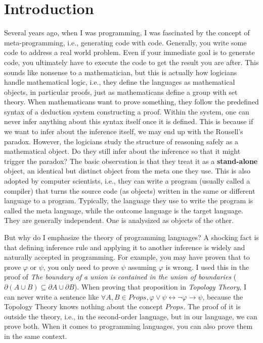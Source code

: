 \chapter*{Introduction}

Several years ago, when I was programming, I was fascinated
by the concept of meta-programming, i.e., generating code with code. 
Generally, you write some code to address a real world problem. 
Even if your immediate goal is to generate code, you ultimately have
to execute the code to get the result you are after. 
This sounds like nonsense to a mathematician, but this is actually how 
logicians handle mathematical logic, i.e., they define the languages as 
mathematical objects, in particular proofs, just as mathematicans define 
a group with set theory. When mathematicans want to prove something, they 
follow the predefined syntax of a deduction system constructing a proof. 
Within the system, one can never infer anything about this syntax itself 
once it is defined. This is because if we want to infer about the 
inference itself, we may end up with the Rousell's paradox. However, the 
logicians study the structure of reasoning safely as a mathematical object. 
Do they still infer about the inference so that it might trigger the 
paradox? The basic observation is that they treat it as a 
{\bf stand-alone} object, an identical but distinct object from the meta 
one they use. This is also adopted by computer scientists, i.e., they can 
write a program (usually called a compiler) that turns the source code 
(as objects) written in the same or different language to a program. 
Typically, the language they use to write the program is called the meta 
language, while the outcome language is the target language. They are 
generally independent. One is analysized as objects of the other. 

But why do I emphasize the theory of programming languages? A shocking 
fact is that defining inference rule and applying it to another 
inference is widely and naturally accepted in programming. For example, 
you may have proven that to prove $\varphi$ or $\psi$, you only need to 
prove $\psi$ assuming $\varphi$ is wrong. I used this in the proof of 
{\it The boundary of a union is contained in the union of boundaries} 
($\partial(A\cup B)\subseteq \partial A \cup\partial B$). 
When proving that proposition in {\it Topology Theory}, I can never 
write a sentence like $\forall A,B\in Props,\varphi\vee\psi \leftrightarrow
\neg\varphi\rightarrow\psi$, because the Topology Theory knows nothing
about the concept $Props$. The proof of it is outside the theory,
i.e., in the second-order language, but in our language, we can
prove both. When it comes to programming languages, you can also
prove them in the same context. 

